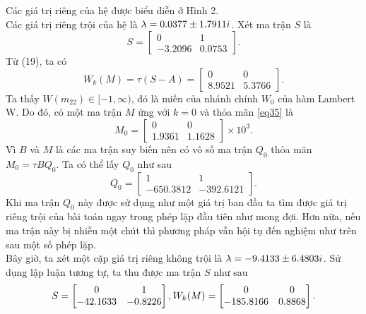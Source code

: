 Các giá trị riêng của hệ được biểu diễn ở Hình 2.\\
Các giá trị riêng trội của hệ là $\lambda = 0.0377 \pm 1.7911i$. Xét ma trận $S$ là
\begin{equation}\label{eq34}
	S= \begin{bmatrix}
		0 & 1 \\ -3.2096 & 0.0753
	\end{bmatrix}.
\end{equation}
Từ (19), ta có
\begin{equation}\label{eq35}
	W_k(M) = \tau (S-A) = \begin{bmatrix}
		0 & 0 \\ 8.9521 & 5.3766
	\end{bmatrix}.
\end{equation}
Ta thấy $W(m_{22}) \in [-1, \infty)$, đó là miền của nhánh chính $W_0$ của hàm Lambert W. Do đó, có một ma trận $M$ ứng với $k =0$ và thỏa mãn \eqref{eq35} là
\begin{equation}\label{eq36}
	M_0 = \begin{bmatrix}
		0 & 0\\ 1.9361 &1.1628
	\end{bmatrix} \times 10^3 .
\end{equation}
Vì $B$ và $M$ là các ma trận suy biến nên có vô số ma trận $Q_0$ thỏa mãn $M_0 = \tau B Q_0$. Ta có thể lấy $Q_0$ như sau
\begin{equation}\label{eq37}
	Q_0 = \begin{bmatrix}
		1 & 1\\ -650.3812 &-392.6121
	\end{bmatrix} .
\end{equation}
Khi ma trận $Q_0$ này được sử dụng như một giá trị ban đầu ta tìm được giá trị riêng trội của bài toán ngay trong phép lặp đầu tiên như mong đợi. Hơn nữa, nếu ma trận này bị nhiễu một chút thì phương pháp vẫn hội tụ đến nghiệm như trên sau một số phép lặp.\\
Bây giờ, ta xét một cặp giá trị riêng không trội là $\lambda = -9.4133 \pm 6.4803i$. Sử dụng lập luận tương tự, ta thu được ma trận $S$ như sau
\begin{equation}\label{eq38}
	S=\begin{bmatrix}
		0&1\\-42.1633 & -0.8226
	\end{bmatrix},\\
	W_k(M)=\begin{bmatrix}
		0 & 0\\ -185.8166 & 0.8868
	\end{bmatrix}.
\end{equation}
